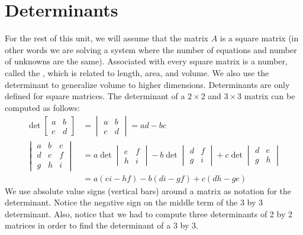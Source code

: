 \section{Determinants}
For the rest of this unit, we will assume that the matrix $A$ is a square matrix (in other words we are solving a system where the number of equations and number of unknowns are the same).
Associated with every square matrix is a number, called the , which is related to length, area, and volume.  We also use the determinant to generalize volume to higher dimensions. Determinants are only defined for square matrices.
The determinant of a {$2\times 2$} and {$3\times 3$} matrix can be computed as follows: 
\begin{align*}
\det\begin{bmatrix}a&b\\c&d\end{bmatrix} &=\begin{vmatrix}a&b\\c&d\end{vmatrix} = ad-bc\\
\begin{vmatrix}a&b&c\\d&e&f\\g&h&i\end{vmatrix} &= a\det\begin{vmatrix}e&f\\h&i\end{vmatrix} -b\det\begin{vmatrix}d&f\\g&i\end{vmatrix} +c\det\begin{vmatrix}d&e\\g&h\end{vmatrix}\\
&=a(ei-hf)-b(di-gf)+c(dh-ge)
\end{align*}
We use absolute value signs (vertical bars) around a matrix as
notation for the determinant. Notice the negative sign on the middle
term of the 3 by 3 determinant. Also, notice that we had to compute three determinants of 2 by 2 matrices in order to find the determinant of a 3 by 3.  

